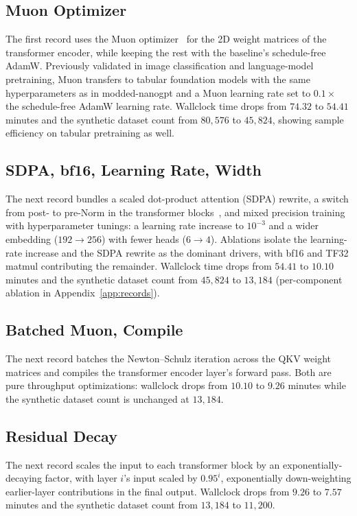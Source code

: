 \documentclass{article}
\theoremstyle{plain}
\theoremstyle{definition}
\theoremstyle{remark}
\begin{document}
\subsection{Muon Optimizer}
The first record uses the Muon optimizer~\citep{jordan2024muon} for the 2D weight matrices of the transformer encoder, while keeping the rest with the baseline's schedule-free AdamW.
Previously validated in image classification and language-model pretraining, Muon transfers to tabular foundation models with the same hyperparameters as in modded-nanogpt and a Muon learning rate set to $0.1\times$ the schedule-free AdamW learning rate.
Wallclock time drops from $74.32$ to $54.41$ minutes and the synthetic dataset count from $80{,}576$ to $45{,}824$, showing sample efficiency on tabular pretraining as well.

\subsection{SDPA, bf16, Learning Rate, Width}
The next record bundles a scaled dot-product attention (SDPA) rewrite, a switch from post- to pre-Norm in the transformer blocks~\citep{xiong2020prenorm}, and mixed precision training with hyperparameter tunings: a learning rate increase to $10^{-3}$ and a wider embedding ($192\to 256$) with fewer heads ($6\to 4$).
Ablations isolate the learning-rate increase and the SDPA rewrite as the dominant drivers, with bf16 and TF32 matmul contributing the remainder.
Wallclock time drops from $54.41$ to $10.10$ minutes and the synthetic dataset count from $45{,}824$ to $13{,}184$ (per-component ablation in Appendix~\ref{app:records}).

\subsection{Batched Muon, Compile}
The next record batches the Newton--Schulz iteration across the QKV weight matrices and compiles the transformer encoder layer's forward pass.
Both are pure throughput optimizations: wallclock drops from $10.10$ to $9.26$ minutes while the synthetic dataset count is unchanged at $13{,}184$.

\subsection{Residual Decay}
The next record scales the input to each transformer block by an exponentially-decaying factor, with layer $i$'s input scaled by $0.95^i$, exponentially down-weighting earlier-layer contributions in the final output.
Wallclock drops from $9.26$ to $7.57$ minutes and the synthetic dataset count from $13{,}184$ to $11{,}200$.
\end{document}
